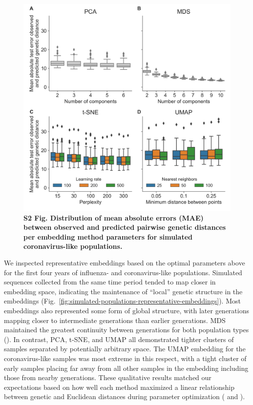 \documentclass[10pt,letterpaper]{article}
\begin{document}
\begin{figure}[!h]
\includegraphics[width=\columnwidth]{figures/simulated-coronavirus-like-with-moderate-recombination-rate-scores-by-parameters.png}
\caption*{{\bf S2 Fig. Distribution of mean absolute errors (MAE) between observed and predicted pairwise genetic distances per embedding method parameters for simulated coronavirus-like populations.}}
\end{figure}

We inspected representative embeddings based on the optimal parameters above for the first four years of influenza- and coronavirus-like populations.
Simulated sequences collected from the same time period tended to map closer in embedding space, indicating the maintenance of ``local'' genetic structure in the embeddings (Fig.~\ref{fig:simulated-populations-representative-embeddings}).
Most embeddings also represented some form of global structure, with later generations mapping closer to intermediate generations than earlier generations.
MDS maintained the greatest continuity between generations for both population types ().
In contrast, PCA, t-SNE, and UMAP all demonstrated tighter clusters of samples separated by potentially arbitrary space.
The UMAP embedding for the coronavirus-like samples was most extreme in this respect, with a tight cluster of early samples placing far away from all other samples in the embedding including those from nearby generations.
These qualitative results matched our expectations based on how well each method maximized a linear relationship between genetic and Euclidean distances during parameter optimization ( and ).
\end{document}
